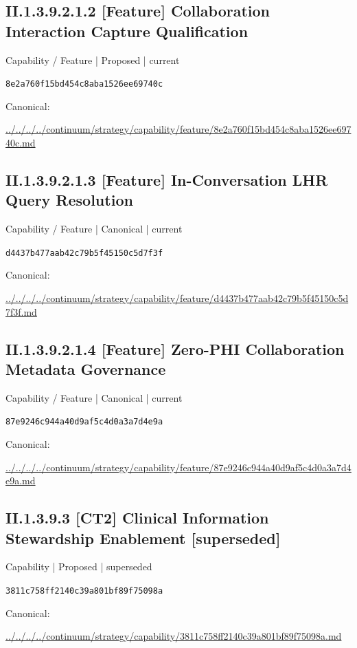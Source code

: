 \documentclass[10pt,a4paper]{article}
\begin{document}
\subsection*{II.1.3.9.2.1.2 [Feature] Collaboration Interaction Capture Qualification}
\label{element-8e2a760f15bd454c8aba1526ee69740c}
{\small Capability / Feature | Proposed | current}\par
\texttt{8e2a760f15bd454c8aba1526ee69740c}\par
Canonical: \par
{\footnotesize\url{../../../../continuum/strategy/capability/feature/8e2a760f15bd454c8aba1526ee69740c.md}}\par
\subsection*{II.1.3.9.2.1.3 [Feature] In-Conversation LHR Query Resolution}
\label{element-d4437b477aab42c79b5f45150c5d7f3f}
{\small Capability / Feature | Canonical | current}\par
\texttt{d4437b477aab42c79b5f45150c5d7f3f}\par
Canonical: \par
{\footnotesize\url{../../../../continuum/strategy/capability/feature/d4437b477aab42c79b5f45150c5d7f3f.md}}\par
\subsection*{II.1.3.9.2.1.4 [Feature] Zero-PHI Collaboration Metadata Governance}
\label{element-87e9246c944a40d9af5c4d0a3a7d4e9a}
{\small Capability / Feature | Canonical | current}\par
\texttt{87e9246c944a40d9af5c4d0a3a7d4e9a}\par
Canonical: \par
{\footnotesize\url{../../../../continuum/strategy/capability/feature/87e9246c944a40d9af5c4d0a3a7d4e9a.md}}\par
\subsection*{II.1.3.9.3 [CT2] Clinical Information Stewardship Enablement [superseded]}
\label{element-3811c758ff2140c39a801bf89f75098a}
{\small Capability | Proposed | superseded}\par
\texttt{3811c758ff2140c39a801bf89f75098a}\par
Canonical: \par
{\footnotesize\url{../../../../continuum/strategy/capability/3811c758ff2140c39a801bf89f75098a.md}}\par
\end{document}
